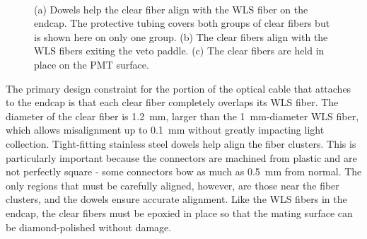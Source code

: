 \begin{figure}[!htbp]
\centering
{} \\
\caption[A view of the cable that connects the scintillator to the PMT.]{(a) Dowels help the clear fiber align with the WLS fiber on the endcap.  The protective tubing covers both groups of clear fibers but is shown here on only one group. (b) The clear fibers align with the WLS fibers exiting the veto paddle.  (c) The clear fibers are held in place on the PMT surface.}
\label{fig:paddleCable}
\end{figure}

The primary design constraint for the portion of the optical cable that attaches to the endcap is that each clear fiber completely overlaps its WLS fiber.  The diameter of the clear fiber is 1.2~mm, larger than the 1~mm-diameter WLS fiber, which allows misalignment up to 0.1~mm without greatly impacting light collection.  Tight-fitting stainless steel dowels help align the fiber clusters.  This is particularly important because the connectors are machined from plastic and are not perfectly square - some connectors bow as much as 0.5~mm from normal.  The only regions that must be carefully aligned, however, are those near the fiber clusters, and the dowels ensure accurate alignment.  Like the WLS fibers in the endcap, the clear fibers must be epoxied in place so that the mating surface can be diamond-polished without damage.  

